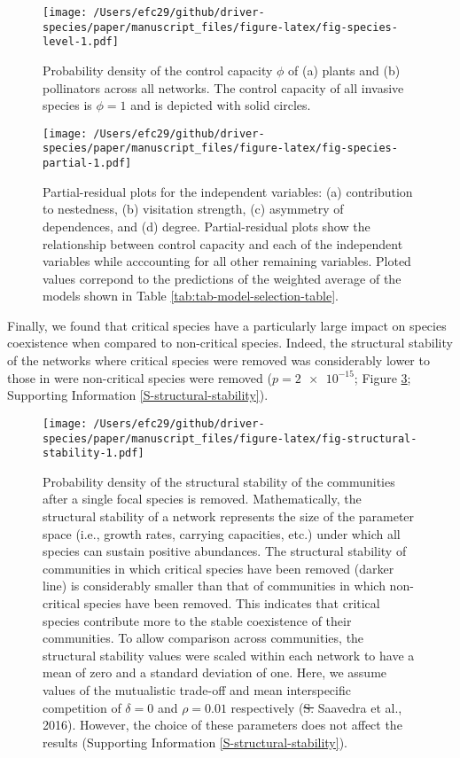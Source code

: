 \documentclass[a4paper]{artikel1}
\theoremstyle{definition}
\theoremstyle{definition}
\theoremstyle{definition}
\theoremstyle{remark}
\providecommand{\DIFdeltex}[1]{{\protect\color{red}\sout{#1}}}                      %
\providecommand{\DIFdelFL}[1]{\DIFdel{#1}} %
\providecommand{\DIFdelbeginFL}{} %
\providecommand{\DIFdelendFL}{} %
\providecommand{\DIFdel}[1]{\texorpdfstring{\DIFdeltex{#1}}{}} %
\begin{document}
\begin{figure}
\centering
\texttt{[image: /Users/efc29/github/driver-species/paper/manuscript\_files/figure-latex/fig-species-level-1.pdf]}
\caption{\label{fig:fig-species-level}Probability density of the control
capacity \(\phi\) of (a) plants and (b) pollinators across all networks.
The control capacity of all invasive species is \(\phi = 1\) and is
depicted with solid circles.}
\end{figure}

\begin{figure}
\centering
\texttt{[image: /Users/efc29/github/driver-species/paper/manuscript\_files/figure-latex/fig-species-partial-1.pdf]}
\caption{\label{fig:fig-species-partial}Partial-residual plots for the
independent variables: (a) contribution to nestedness, (b) visitation
strength, (c) asymmetry of dependences, and (d) degree. Partial-residual
plots show the relationship between control capacity and each of the
independent variables while acccounting for all other remaining
variables. Ploted values correpond to the predictions of the weighted
average of the models shown in Table
\ref{tab:tab-model-selection-table}.}
\end{figure}

Finally, we found that critical species have a particularly large impact
on species coexistence when compared to non-critical species. Indeed,
the structural stability of the networks where critical species were
removed was considerably lower to those in were non-critical species
were removed (\(p = \num{2e-15}\); Figure
\ref{fig:fig-structural-stability}; Supporting Information
\ref{S-structural-stability}).

\begin{figure}
\centering
\texttt{[image: /Users/efc29/github/driver-species/paper/manuscript\_files/figure-latex/fig-structural-stability-1.pdf]}
\caption{\label{fig:fig-structural-stability}Probability density of the
structural stability of the communities after a single focal species is
removed. Mathematically, the structural stability of a network
represents the size of the parameter space (i.e., growth rates, carrying
capacities, etc.) under which all species can sustain positive
abundances. The structural stability of communities in which critical
species have been removed (darker line) is considerably smaller than
that of communities in which non-critical species have been removed.
This indicates that critical species contribute more to the stable
coexistence of their communities. To allow comparison across
communities, the structural stability values were scaled within each
network to have a mean of zero and a standard deviation of one. Here, we
assume values of the mutualistic trade-off and mean interspecific
competition of \(\delta = 0\) and \(\rho = 0.01\) respectively (\DIFdelbeginFL \DIFdelFL{S.
}\DIFdelendFL Saavedra
et al., 2016). However, the choice of these parameters does not affect
the results (Supporting Information \ref{S-structural-stability}).}
\end{figure}
\end{document}
